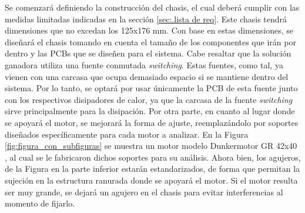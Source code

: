 \noindent
Se comenzará definiendo la construcción del chasis, el cual deberá cumplir con las medidas limitadas indicadas en la sección \ref{sec:.lista de req}. Este chasis tendrá dimensiones que no excedan los 125x176 mm. Con base en estas dimensiones, se diseñará el chasis tomando en cuenta el tamaño de los componentes que irán por dentro y las \ac{PCB}s que se diseñen para el sistema. Cabe resaltar que la solución ganadora utiliza una fuente conmutada \textit{switching}. Estas fuentes, como tal, ya vienen con una carcasa que ocupa demasiado espacio si se mantiene dentro del sistema. Por lo tanto, se optará por usar únicamente la \ac{PCB} de esta fuente junto con los respectivos disipadores de calor, ya que la carcasa de la fuente \textit{switching} sirve principalmente para la disipación. 
Por otra parte, en cuanto al lugar donde se apoyará el motor, se mejorará la forma de ajuste, reemplazándolo por soportes diseñados específicamente para cada motor a analizar. En la Figura \ref{fig:figura_con_subfiguras} se muestra un motor modelo Dunkermotor GR 42x40 \textcite{dunkermotoren}, al cual se le fabricaron dichos soportes para su análisis. Ahora bien, los agujeros, de la Figura  en la parte inferior estarán estandarizados, de forma que permitan la sujeción en la estructura ranurada donde se apoyará el motor. Si el motor resulta ser muy grande, se dejará un agujero en el chasis para evitar interferencias al momento de fijarlo.
    

